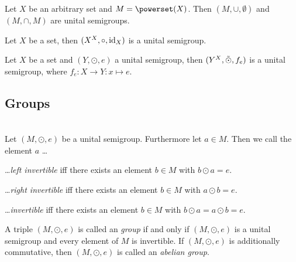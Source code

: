 \begin{examples}
    \begin{exampleenumerate}
        \item Let $X$ be an arbitrary set and $M=\powerset(X)$. Then $(M,\cup,\emptyset)$ and $(M,\cap,M)$ are unital semigroups.
        \item Let $X$ be a set, then $(\mapset X X,\circ,\idmap_X)$ is a unital semigroup.
        \item Let $X$ be a set and $(Y,\odot,e)$ a unital semigroup, then $(\mapset X Y,\tilde{\odot},f_e)$ is a unital semigroup, where $f_e\colon X\to Y\colon x\mapsto e$.
    \end{exampleenumerate}
\end{examples}

\subsection{Groups}

\begin{definition}~\\
    Let $(M,\odot,e)$ be a unital semigroup. Furthermore let $a\in M$. Then we call the element $a$ \dots
    \begin{definitionenumerate}
        \item \dots \emph{left invertible} iff there exists an element $b\in M$ with $b\odot a=e$.
        \item \dots \emph{right invertible} iff there exists an element $b\in M$ with $a\odot b=e$.
        \item \dots \emph{invertible} iff there exists an element $b\in M$ with $b\odot a=a\odot b=e$.
    \end{definitionenumerate}
    A triple $(M,\odot,e)$ is called an \emph{group} if and only if $(M,\odot,e)$ is a unital semigroup and every element of $M$ is invertible. If $(M,\odot,e)$ is additionally commutative, then $(M,\odot,e)$ is called an \emph{abelian group}.
\end{definition}

